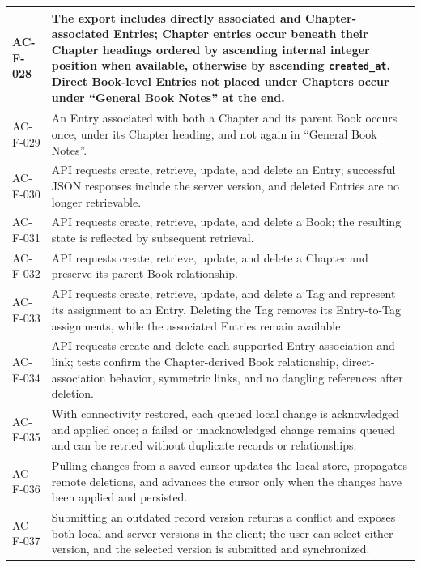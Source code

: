 \documentclass[11pt,a4paper]{article}
\begin{document}
\begin{longtable}{|L{2.4cm}|L{13.6cm}|}
AC-F-028 & The export includes directly associated and Chapter-associated Entries; Chapter entries occur beneath their Chapter headings ordered by ascending internal integer position when available, otherwise by ascending \texttt{created\_at}. Direct Book-level Entries not placed under Chapters occur under ``General Book Notes'' at the end. \\ \hline
AC-F-029 & An Entry associated with both a Chapter and its parent Book occurs once, under its Chapter heading, and not again in ``General Book Notes''. \\ \hline
AC-F-030 & API requests create, retrieve, update, and delete an Entry; successful JSON responses include the server version, and deleted Entries are no longer retrievable. \\ \hline
AC-F-031 & API requests create, retrieve, update, and delete a Book; the resulting state is reflected by subsequent retrieval. \\ \hline
AC-F-032 & API requests create, retrieve, update, and delete a Chapter and preserve its parent-Book relationship. \\ \hline
AC-F-033 & API requests create, retrieve, update, and delete a Tag and represent its assignment to an Entry. Deleting the Tag removes its Entry-to-Tag assignments, while the associated Entries remain available. \\ \hline
AC-F-034 & API requests create and delete each supported Entry association and link; tests confirm the Chapter-derived Book relationship, direct-association behavior, symmetric links, and no dangling references after deletion. \\ \hline
AC-F-035 & With connectivity restored, each queued local change is acknowledged and applied once; a failed or unacknowledged change remains queued and can be retried without duplicate records or relationships. \\ \hline
AC-F-036 & Pulling changes from a saved cursor updates the local store, propagates remote deletions, and advances the cursor only when the changes have been applied and persisted. \\ \hline
AC-F-037 & Submitting an outdated record version returns a conflict and exposes both local and server versions in the client; the user can select either version, and the selected version is submitted and synchronized. \\ \hline
\end{longtable}
\end{document}
